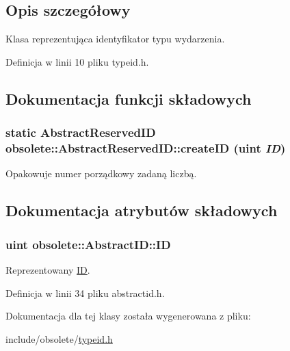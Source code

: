 \subsection{Opis szczegółowy}
Klasa reprezentująca identyfikator typu wydarzenia. 

Definicja w linii 10 pliku typeid.h.



\subsection{Dokumentacja funkcji składowych}
\hypertarget{classobsolete_1_1AbstractReservedID_a38fa00bf6097ab9cff285c8480c8097e}{
\subsubsection[{createID}]{\setlength{\rightskip}{0pt plus 5cm}static {\bf AbstractReservedID} obsolete::AbstractReservedID::createID (uint {\em ID})}}
\label{classobsolete_1_1AbstractReservedID_a38fa00bf6097ab9cff285c8480c8097e}


Opakowuje numer porządkowy zadaną liczbą. 



\subsection{Dokumentacja atrybutów składowych}
\hypertarget{classobsolete_1_1AbstractID_a5f67fa1c7d96085f0ef41193b60b570c}{
\subsubsection[{ID}]{\setlength{\rightskip}{0pt plus 5cm}uint {\bf obsolete::AbstractID::ID}}}
\label{classobsolete_1_1AbstractID_a5f67fa1c7d96085f0ef41193b60b570c}


Reprezentowany \hyperlink{classobsolete_1_1ID}{ID}. 



Definicja w linii 34 pliku abstractid.h.



Dokumentacja dla tej klasy została wygenerowana z pliku:\begin{DoxyCompactItemize}
\item 
include/obsolete/\hyperlink{typeid_8h}{typeid.h}\end{DoxyCompactItemize}
